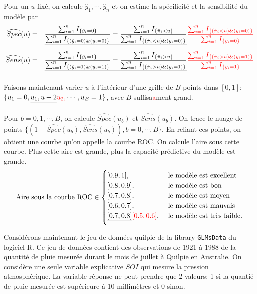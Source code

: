 \documentclass[11pt]{article}
\begin{document}
\noindent Pour un $u$ fixé, on calcule $\hat y_1, \cdots, \hat y_n$ et on estime la spécificité et la sensibilité du modèle par 
\begin{eqnarray*}
\widehat{Spec}(u)&=&\sout{\frac{\sum_{i=1}^n I_{\{\hat y_i=0\}}}{\sum_{i=1}^n I_{\{(\hat y_i=0)\&(y_i=0)\}}} = \frac{\sum_{i=1}^n I_{\{\hat \pi_i < u \}}}{\sum_{i=1}^n I_{\{(\hat \pi_i < u)\&(y_i=0)\}}}} \textcolor{red}{\frac{\sum_{i=1}^n I_{\{(\hat \pi_i < u)\&(y_i=0)\}}}{\sum_{i=1}^n I_{\{y_i=0\}}}} \\
\widehat{Sens}(u)&=&\sout{\frac{\sum_{i=1}^n I_{\{\hat y_i=1\}}}{\sum_{i=1}^n I_{\{(\hat y_i=1)\&(y_i=1)\}}} = \frac{\sum_{i=1}^n I_{\{\hat \pi_i > u \}}}{\sum_{i=1}^n I_{\{(\hat \pi_i > u)\&(y_i=1)\}}}} \textcolor{red}{\frac{\sum_{i=1}^n I_{\{(\hat \pi_i > u)\&(y_i=1)\}}}{\sum_{i=1}^n I_{\{y_i=1\}}}}
\end{eqnarray*}

\noindent Faisons maintenant varier $u$ \`a l'intérieur d'une grille de $B$ points dans $[0,1]$: $\{u_1=0,\sout{u_1,u+2}\textcolor{red}{u_2,}\cdots,u_B=1\}$, avec $B$ suffis\sout{a}\textcolor{red}{a}ment grand.

\noindent Pour $b=0,1,\cdots,B$, on calcule $\widehat{Spec}(u_b)$ et $\widehat{Sens}(u_b)$. On trace le nuage de points $\{(1-\widehat{Spec}(u_b),\widehat{Sens}(u_b)),b=0,\cdots,B\}$. En reliant ces points, on obtient une courbe qu'on appelle la courbe ROC. On calcule l'aire sous cette courbe. Plus cette aire est grande, plus la capacité prédictive du modèle est grande. 
$$
\mbox{Aire sous la courbe ROC} \in \begin{cases}
[0.9,1], & \mbox{ le modèle est excellent} \\
[0.8,0.9], & \mbox{ le modèle est bon} \\
[0.7,0.8], & \mbox{ le modèle est moyen} \\
[0.6,0.7], & \mbox{ le modèle est mauvais} \\
\sout{[0.7,0.8]}\textcolor{red}{[0.5,0.6]}, & \mbox{ le modèle est très faible.} \\
\end{cases}
$$

\noindent Considérons maintenant le jeu de données \textsf{quilpie} de la library \texttt{GLMsData} du logiciel \textrm{R}. Ce jeu de données contient des observations de 1921 \`a 1988 de la quantité de pluie mesurée durant le mois de juillet \`a Quilpie en Australie. On considère une seule variable explicative $SOI$ qui mesure la pression atmosphérique. La variable réponse ne peut prendre que 2 valeurs: 1 si la quantié de pluie mesurée est supérieure \`a 10 millimètres et 0 sinon.
\end{document}
